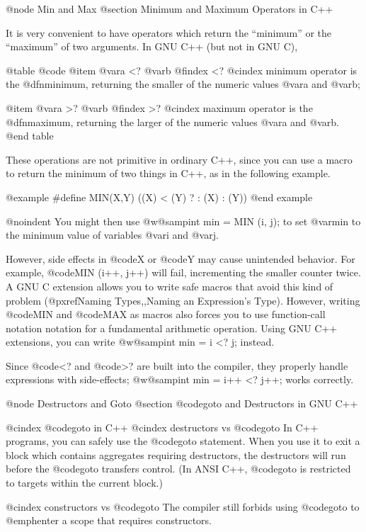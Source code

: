 {{{{{@node Min and Max
@section Minimum and Maximum Operators in C++

It is very convenient to have operators which return the ``minimum'' or the
``maximum'' of two arguments.  In GNU C++ (but not in GNU C),

@table @code
@item @var{a} <? @var{b}
@findex <?
@cindex minimum operator
is the @dfn{minimum}, returning the smaller of the numeric values
@var{a} and @var{b};

@item @var{a} >? @var{b}
@findex >?
@cindex maximum operator
is the @dfn{maximum}, returning the larger of the numeric values @var{a}
and @var{b}.
@end table

These operations are not primitive in ordinary C++, since you can
use a macro to return the minimum of two things in C++, as in the
following example.

@example
#define MIN(X,Y) ((X) < (Y) ? : (X) : (Y))
@end example

@noindent
You might then use @w{@samp{int min = MIN (i, j);}} to set @var{min} to
the minimum value of variables @var{i} and @var{j}.

However, side effects in @code{X} or @code{Y} may cause unintended
behavior.  For example, @code{MIN (i++, j++)} will fail, incrementing
the smaller counter twice.  A GNU C extension allows you to write safe
macros that avoid this kind of problem (@pxref{Naming Types,,Naming an
Expression's Type}).  However, writing @code{MIN} and @code{MAX} as
macros also forces you to use function-call notation notation for a
fundamental arithmetic operation.  Using GNU C++ extensions, you can
write @w{@samp{int min = i <? j;}} instead.

Since @code{<?} and @code{>?} are built into the compiler, they properly
handle expressions with side-effects;  @w{@samp{int min = i++ <? j++;}}
works correctly.

@node Destructors and Goto
@section @code{goto} and Destructors in GNU C++

@cindex @code{goto} in C++
@cindex destructors vs @code{goto}
In C++ programs, you can safely use the @code{goto} statement.  When you
use it to exit a block which contains aggregates requiring destructors,
the destructors will run before the @code{goto} transfers control.  (In
ANSI C++, @code{goto} is restricted to targets within the current
block.)

@cindex constructors vs @code{goto}
The compiler still forbids using @code{goto} to @emph{enter} a scope
that requires constructors.

}}}}}
